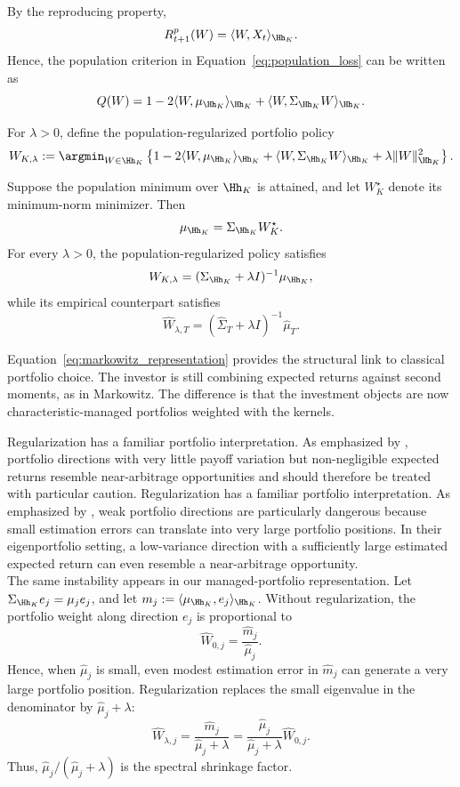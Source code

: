 By the reproducing property,
\[
R^p_{t+1}(W)
=
\langle W,X_t\rangle_{\Hh_K}.
\]
Hence, the population criterion in
Equation~\eqref{eq:population_loss} can be written as
\[
Q(W)
=
1-2\langle W,\mu_{\Hh_K}\rangle_{\Hh_K}
+\langle W,\Sigma_{\Hh_K}W\rangle_{\Hh_K}.
\]

For $\lambda>0$, define the population-regularized
portfolio policy
\[
W_{K,\lambda}
:=
\argmin_{W\in\Hh_K}
\left\{
1-2\langle W,\mu_{\Hh_K}\rangle_{\Hh_K}
+\langle W,\Sigma_{\Hh_K}W\rangle_{\Hh_K}+\lambda\|W\|_{\Hh_K}^2
\right\}.
\]


\begin{proposition}
\label{prop:managed_markowitz}

Suppose the population minimum over $\Hh_K$ is
attained, and let $W_K^\star$ denote its
minimum-norm minimizer. Then
\[
\mu_{\Hh_K}
=
\Sigma_{\Hh_K}W_K^\star.
\]
For every $\lambda>0$, the population-regularized
policy satisfies
\[
W_{K,\lambda}
=
(\Sigma_{\Hh_K}+\lambda I)^{-1}
\mu_{\Hh_K},
\]
while its empirical counterpart satisfies
\[
\widehat W_{\lambda,T}
=
(\widehat\Sigma_T+\lambda I)^{-1}
\widehat\mu_T.
\]
\end{proposition}


Equation~\eqref{eq:markowitz_representation} provides the structural link to
classical portfolio choice. The investor is still combining expected returns
against second moments, as in Markowitz. The difference is that the investment
objects are now characteristic-managed portfolios weighted with the kernels.

Regularization has a familiar portfolio interpretation. As emphasized by
\citet{kozaknagelsantosh2020}, portfolio directions with very little payoff
variation but non-negligible expected returns resemble near-arbitrage
opportunities and should therefore be treated with particular caution.
Regularization has a familiar portfolio interpretation. As emphasized by
\citet{kozaknagelsantosh2020}, weak portfolio directions are particularly
dangerous because small estimation errors can translate into very large
portfolio positions. In their eigenportfolio setting, a low-variance direction
with a sufficiently large estimated expected return can even resemble a
near-arbitrage opportunity.\\
The same instability appears in our managed-portfolio representation. Let
$\Sigma_{\Hh_K}e_j=\mu_j e_j$, and let
$m_j:=\langle\mu_{\Hh_K},e_j\rangle_{\Hh_K}$.
Without regularization, the portfolio weight along direction $e_j$ is
proportional to
\[
\widehat W_{0,j}
=
\frac{\widehat m_j}{\widehat\mu_j}.
\]
Hence, when $\widehat\mu_j$ is small, even modest estimation error in
$\widehat m_j$ can generate a very large portfolio position. Regularization
replaces the small eigenvalue in the denominator by
$\widehat\mu_j+\lambda$:
\[
\widehat W_{\lambda,j}
=
\frac{\widehat m_j}{\widehat\mu_j+\lambda}
=
\frac{\widehat\mu_j}{\widehat\mu_j+\lambda}
\widehat W_{0,j}.
\]
Thus, $\widehat\mu_j/(\widehat\mu_j+\lambda)$ is the spectral shrinkage factor.



